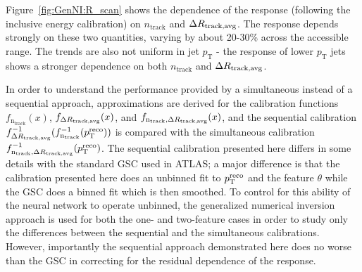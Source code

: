 Figure~\ref{fig:GenNI:R_scan} shows the dependence of the response (following the inclusive energy calibration) on $n_\text{track}$ and $\Delta R_\text{track,avg}$.  The response depends strongly on these two quantities, varying by about  20-30\% across the accessible range.  The trends are also not uniform in jet $p_\text{T}$ - the response of lower $p_\text{T}$ jets shows a stronger dependence on both $n_\text{track}$ and $\Delta R_\text{track,avg}$.



In order to understand the performance provided by a simultaneous instead of a sequential approach, approximations are derived for the calibration functions $f_{\text{n}_\text{track}}(x)$, $f_{\Delta R_\text{track,avg}}(x)$, and $f_{\text{n}_\text{track},\Delta R_\text{track,avg}}(x)$, and the sequential calibration $f^{-1}_{\Delta R_\text{track,avg}}(f^{-1}_{\text{n}_\text{track}}(p_\text{T}^\text{reco}))$ is compared with the simultaneous calibration $f^{-1}_{\text{n}_\text{track},\Delta R_\text{track,avg}}(p_\text{T}^\text{reco})$.
The sequential calibration presented here differs in some details with the standard GSC used in ATLAS; a major difference is that the calibration presented here does an unbinned fit to $p_\text{T}^\text{reco}$ and the feature $\theta$ while the GSC does a binned fit which is then smoothed.
To control for this ability of the neural network to operate unbinned, the generalized numerical inversion approach is used for both the one- and two-feature cases in order to study only the differences between the sequential and the simultaneous calibrations.  
However, importantly the sequential approach demonstrated here does no worse than the GSC in correcting for the residual dependence of the response.

